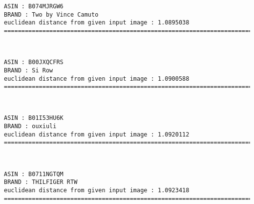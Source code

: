 \documentclass[11pt]{article}
\begin{document}
    \begin{Verbatim}[commandchars=\\\{\}]
ASIN : B074MJRGW6
BRAND : Two by Vince Camuto
euclidean distance from given input image : 1.0895038
=============================================================================================================================

    \end{Verbatim}

    \begin{center}
    \end{center}
    { \hspace*{\fill} \\}
    
    \begin{Verbatim}[commandchars=\\\{\}]
ASIN : B00JXQCFRS
BRAND : Si Row
euclidean distance from given input image : 1.0900588
=============================================================================================================================

    \end{Verbatim}

    \begin{center}
    \end{center}
    { \hspace*{\fill} \\}
    
    \begin{Verbatim}[commandchars=\\\{\}]
ASIN : B01I53HU6K
BRAND : ouxiuli
euclidean distance from given input image : 1.0920112
=============================================================================================================================

    \end{Verbatim}

    \begin{center}
    \end{center}
    { \hspace*{\fill} \\}
    
    \begin{Verbatim}[commandchars=\\\{\}]
ASIN : B0711NGTQM
BRAND : THILFIGER RTW
euclidean distance from given input image : 1.0923418
=============================================================================================================================

    \end{Verbatim}
\end{document}

